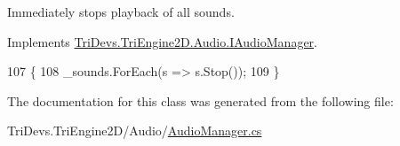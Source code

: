 Immediately stops playback of all sounds. 



Implements \hyperlink{interface_tri_devs_1_1_tri_engine2_d_1_1_audio_1_1_i_audio_manager_a8a2382837eaadbd1fbc2c12eb7e563db}{Tri\-Devs.\-Tri\-Engine2\-D.\-Audio.\-I\-Audio\-Manager}.


\begin{DoxyCode}
107         \{
108             \_sounds.ForEach(s => s.Stop());
109         \}
\end{DoxyCode}


The documentation for this class was generated from the following file\-:\begin{DoxyCompactItemize}
\item 
Tri\-Devs.\-Tri\-Engine2\-D/\-Audio/\hyperlink{_audio_manager_8cs}{Audio\-Manager.\-cs}\end{DoxyCompactItemize}
